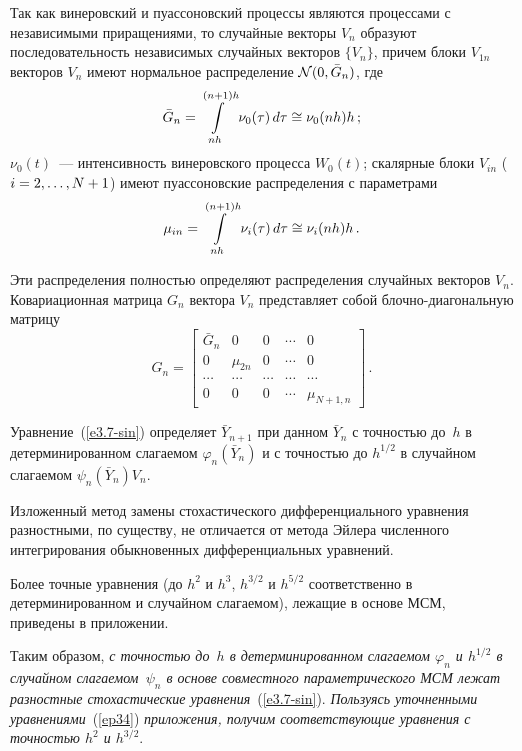 \begin{multicols}{2}
Так как винеровский и пуассоновский процессы являются процессами с
независимыми приращениями, то случайные векторы $V_n$ образуют
последовательность независимых случайных векторов $\{V_n\}$, причем
блоки $V_{1n}$ векторов $V_n$ имеют нормальное распределение ${\cal N}(0,\bar G_n)$, где
\begin{equation*}
\bar G_n =\inh \nu_0(\tau)\,d\tau \cong \nu_0(nh)h\,; %
\end{equation*}
$\nu_0(t)$~--- интенсивность винеровского процесса $W_0(t)$;
скалярные блоки $V_{in}$ ($i\hm=2,\ldots,N+1$) имеют пуассоновские
распределения с параметрами
   \begin{equation*}
   \mu_{in}=\inh \nu_i(\tau)\,d\tau \cong \nu_i(nh)h\,. %
   \end{equation*}

Эти распределения полностью определяют распределения случайных
векторов $V_n$. Ковариационная матрица $G_n$ вектора $V_n$
представляет собой блоч\-но-диа\-го\-наль\-ную матрицу
    \begin{equation*}
    G_n=\begin{bmatrix}
    \bar G_n  &0  &0  &\cdots  &0\\
    0  &\mu_{2n}  &0  &\cdots  &0\\
    \cdots  &\cdots  &\cdots  &\cdots  &\cdots\\
    0  &0  &0  &\cdots  &\mu_{N+1,n} \end{bmatrix}\,. %
    \end{equation*}

Уравнение~(\ref{e3.7-sin}) определяет $\bar Y_{n+1}$ при данном $\bar Y_n$ с
точностью до~$h$ в детерминированном слагаемом $\varphi_n(\bar Y_n)$ и
с точностью до $h^{1/2}$ в случайном слагаемом $\psi_n(\bar Y_n)V_n$.

Изложенный метод замены стохастического дифференциального
уравнения разностными, по существу, не отличается от метода Эйлера
численного интегрирования обыкновенных дифференциальных уравнений.

Более точные уравнения (до $h^2$ и $h^3$, $h^{3/2}$ и $h^{5/2}$ соответственно в детерминированном 
и случайном слагаемом), лежащие в основе МСМ, приведены в приложении.

Таким образом, {\it с точностью до~$h$ в детерминированном слагаемом $\varphi_n$ и $h^{1/2}$ в случайном 
слагаемом~$\psi_n$ в основе совместного параметрического МСМ лежат разностные стохастические уравнения\/}~(\ref{e3.7-sin}). 
{\it Пользуясь уточненными уравнениями\/}~(\ref{ep34}) {\it приложения, получим соответствующие уравнения с точностью $h^2$ и $h^{3/2}$\/}.


\end{multicols}
